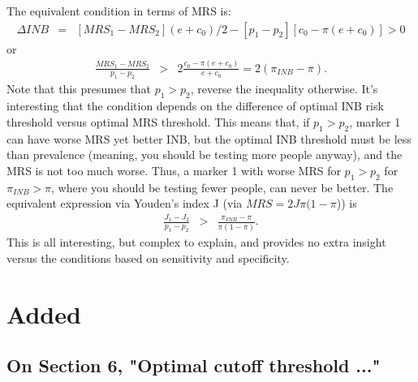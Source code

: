 \documentclass[11pt]{article}
\begin{document}
The equivalent condition in terms of MRS is:
\begin{eqnarray*}
\Delta INB &=& [MRS_1-MRS_2](e+c_0)/2 - [p_1-p_2][c_0-\pi(e+c_0)] >0
\end{eqnarray*}
or 
\begin{eqnarray*}
\frac{MRS_1-MRS_2}{p_1-p_2} &>& 2\frac{c_0-\pi(e+c_0)}{e+c_0} = 2(\pi_{INB}-\pi).
\end{eqnarray*}
Note that this presumes that $p_1>p_2$, reverse the inequality otherwise.  It's interesting that the condition depends on the difference of optimal INB risk threshold versus optimal MRS threshold.  This means that, if $p_1>p_2$, marker 1 can have worse MRS yet better INB, but the optimal INB threshold must be less than prevalence (meaning, you should be testing more people anyway), and the MRS is not too much worse.  Thus, a marker 1 with worse MRS for $p_1>p_2$ for $\pi_{INB}>\pi$, where you should be testing fewer people, can never be better.  The equivalent expression via Youden's index J (via $MRS=2J\pi(1-\pi$)) is
\begin{eqnarray*}
\frac{J_1-J_2}{p_1-p_2} &>& \frac{\pi_{INB}-\pi}{\pi(1-\pi)}.
\end{eqnarray*}
This is all interesting, but complex to explain, and provides no extra insight versus the conditions based on sensitivity and specificity.

 

% 
% 



\section{Added}

\subsection{On Section 6, "Optimal cutoff threshold ..."}
\end{document}
